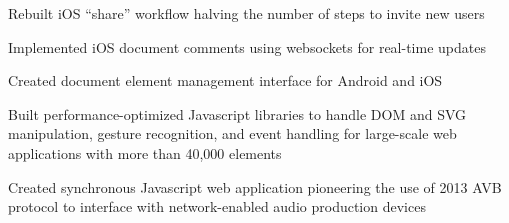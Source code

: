 \documentclass[letterpaper]{deedy-resume} %
\begin{document}
\begin{minipage}[t]{0.66\textwidth}


\begin{tightitemize}
  \item Rebuilt iOS ``share'' workflow halving the number of steps to invite new users
  \item Implemented iOS document comments using websockets for real-time updates
  \item Created document element management interface for Android and iOS
\end{tightitemize}

\sectionspace %



\begin{tightitemize}
  \item Built performance-optimized Javascript libraries to handle DOM and SVG manipulation, gesture recognition, and event handling for large-scale web applications with more than 40,000 elements
  \item Created synchronous Javascript web application pioneering the use of 2013 AVB protocol to interface with network-enabled audio production devices
\end{tightitemize}

\sectionspace %









\end{minipage}
\end{document}
